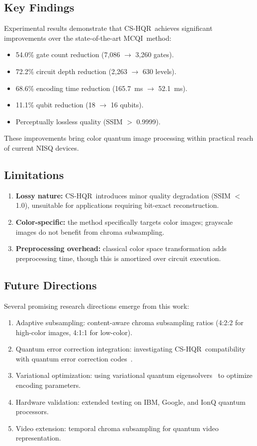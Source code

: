 \documentclass{ipol}
\newcommand{\cshqr}{\textsc{CS-HQR}}
\newcommand{\mcqi}{\textsc{MCQI}}
\begin{document}
\FloatBarrier
\subsection{Key Findings}

Experimental results demonstrate that \cshqr\ achieves significant
improvements over the state-of-the-art \mcqi\ method:
\begin{itemize}
  \item 54.0\% gate count reduction (7,086 $\to$ 3,260 gates).
  \item 72.2\% circuit depth reduction (2,263 $\to$ 630 levels).
  \item 68.6\% encoding time reduction (165.7~ms $\to$ 52.1~ms).
  \item 11.1\% qubit reduction (18 $\to$ 16 qubits).
  \item Perceptually lossless quality (SSIM $>$ 0.9999).
\end{itemize}

These improvements bring color quantum image processing within practical reach
of current NISQ devices.

\FloatBarrier
\subsection{Limitations}

\begin{enumerate}
  \item \textbf{Lossy nature:} \cshqr\ introduces minor quality degradation
    (SSIM $<$ 1.0), unsuitable for applications requiring bit-exact
    reconstruction.
  \item \textbf{Color-specific:} the method specifically targets color images;
    grayscale images do not benefit from chroma subsampling.
  \item \textbf{Preprocessing overhead:} classical color space transformation
    adds preprocessing time, though this is amortized over circuit execution.
\end{enumerate}

\FloatBarrier
\subsection{Future Directions}

Several promising research directions emerge from this work:
\begin{enumerate}
  \item Adaptive subsampling: content-aware chroma subsampling ratios
    (4:2:2 for high-color images, 4:1:1 for low-color).
  \item Quantum error correction integration: investigating \cshqr\
    compatibility with quantum error correction codes~\cite{ref54}.
  \item Variational optimization: using variational quantum eigensolvers~\cite{ref39,ref44,ref51} to
    optimize encoding parameters.
  \item Hardware validation: extended testing on IBM, Google, and IonQ
    quantum processors.
  \item Video extension: temporal chroma subsampling for quantum video
    representation.
\end{enumerate}
\end{document}

